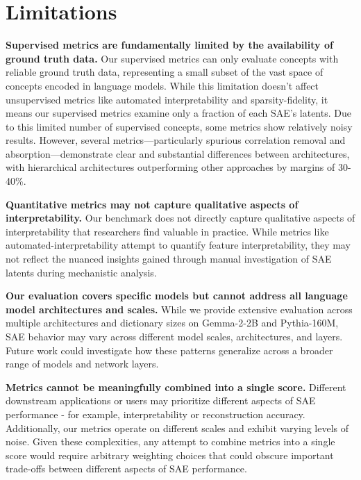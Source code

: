 \documentclass{article}
\theoremstyle{plain}
\theoremstyle{definition}
\theoremstyle{remark}
\begin{document}
\section{Limitations}

\textbf{Supervised metrics are fundamentally limited by the availability of ground truth data.} Our supervised metrics can only evaluate concepts with reliable ground truth data, representing a small subset of the vast space of concepts encoded in language models. While this limitation doesn't affect unsupervised metrics like automated interpretability and sparsity-fidelity, it means our supervised metrics examine only a fraction of each SAE's latents. Due to this limited number of supervised concepts, some metrics show relatively noisy results. However, several metrics---particularly spurious correlation removal and absorption---demonstrate clear and substantial differences between architectures, with hierarchical architectures outperforming other approaches by margins of 30-40\%.

\textbf{Quantitative metrics may not capture qualitative aspects of interpretability.} Our benchmark does not directly capture qualitative aspects of interpretability that researchers find valuable in practice. While metrics like automated-interpretability attempt to quantify feature interpretability, they may not reflect the nuanced insights gained through manual investigation of SAE latents during mechanistic analysis.

\textbf{Our evaluation covers specific models but cannot address all language model architectures and scales.} While we provide extensive evaluation across multiple architectures and dictionary sizes on Gemma-2-2B and Pythia-160M, SAE behavior may vary across different model scales, architectures, and layers. Future work could investigate how these patterns generalize across a broader range of models and network layers.

\textbf{Metrics cannot be meaningfully combined into a single score.} Different downstream applications or users may prioritize different aspects of SAE performance - for example, interpretability or reconstruction accuracy. Additionally, our metrics operate on different scales and exhibit varying levels of noise. Given these complexities, any attempt to combine metrics into a single score would require arbitrary weighting choices that could obscure important trade-offs between different aspects of SAE performance.
\end{document}
